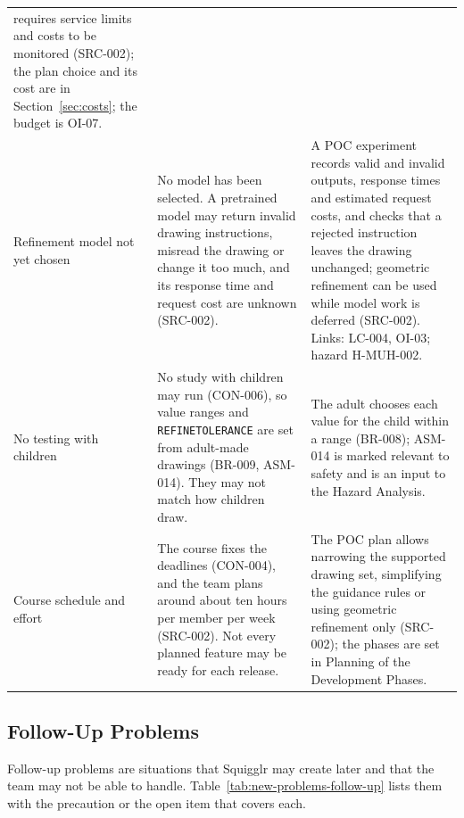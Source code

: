 \documentclass[12pt]{article}
\renewcommand{\_}{\textunderscore\allowbreak}%
\begin{document}
{\begin{longtable}{@{}>{\raggedright\arraybackslash}p{}%
>{\raggedright\arraybackslash}p{}%
>{\raggedright\arraybackslash}p{}@{}}
requires service limits and costs to be monitored (SRC-002); the plan choice and
its cost are in Section~\ref{sec:costs}; the budget is OI-07. \\
\addlinespace
Refinement model not yet chosen & No model has been selected. A pretrained model
may return invalid drawing instructions, misread the drawing or change it too
much, and its response time and request cost are unknown (SRC-002). & A POC
experiment records valid and invalid outputs, response times and estimated
request costs, and checks that a rejected instruction leaves the drawing
unchanged; geometric refinement can be used while model work is deferred
(SRC-002). Links: LC-004, OI-03; hazard H-MUH-002. \\
\addlinespace
No testing with children & No study with children may run (CON-006), so value
ranges and \texttt{REFINE\_TOLERANCE} are set from adult-made drawings (BR-009,
ASM-014). They may not match how children draw. & The adult chooses each value
for the child within a range (BR-008); ASM-014 is marked relevant to safety and
is an input to the Hazard Analysis. \\
\addlinespace
Course schedule and effort & The course fixes the deadlines (CON-004), and the
team plans around about ten hours per member per week (SRC-002). Not every
planned feature may be ready for each release. & The POC plan allows narrowing
the supported drawing set, simplifying the guidance rules or using geometric
refinement only (SRC-002); the phases are set in Planning of the Development
Phases. \\
\end{longtable}
}

\subsection{Follow-Up Problems}
Follow-up problems are situations that Squigglr may create later and that the
team may not be able to handle. Table~\ref{tab:new-problems-follow-up} lists
them with the precaution or the open item that covers each.
\end{document}
